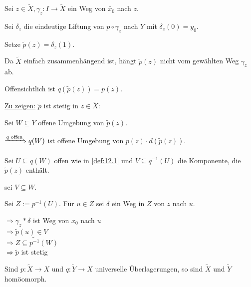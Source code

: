 \begin{beweis}
    Sei $z \in \tilde{X}, \gamma_z: I \rightarrow \tilde{X}$ ein Weg von
    $\tilde{x_0}$ nach $z$.

    Sei $\delta_z$ die eindeutige Liftung von $p \circ \gamma_z$
    nach $Y$ mit $\delta_z(0) = y_0$.

    Setze $\tilde{p}(z) = \delta_z(1)$.

    Da $\tilde{X}$ einfach zusammenhängend ist, hängt $\tilde{p}(z)$
    nicht vom gewählten Weg $\gamma_z$ ab.

    Offensichtlich ist $q(\tilde{p}(z)) = p(z)$.

    \underline{Zu zeigen:} $\tilde{p}$ ist stetig in $z \in \tilde{X}$:
    
    Sei $W \subseteq Y$ offene Umgebung von $\tilde{p}(z)$.

    $\xRightarrow{q \text{ offen}} q(W)$ ist offene Umgebung von $p(z) \cdot d(\tilde{p}(z))$.

    Sei $U \subseteq q(W)$ offen wie in \cref{def:12.1} und
    $V \subseteq q^{-1}(U)$ die Komponente, die $\tilde{p}(z)$
    enthält.

    \Obda sei $V \subseteq W$.

    Sei $Z := p^{-1}(U)$. Für $u \in Z$ sei $\delta$ ein Weg in $Z$
    von $z$ nach $u$.

    $\Rightarrow \gamma_z * \delta$ ist Weg von $x_0$ nach $u$\\
    $\Rightarrow \tilde{p}(u) \in V$\\
    $\Rightarrow Z \subseteq \tilde{p^{-1}}(W)$\\
    $\Rightarrow \tilde{p}$ ist stetig
\end{beweis}

\begin{folgerung}%
    Sind $p:\tilde{X} \rightarrow X$ und $q: \tilde{Y} \rightarrow X$
    universelle Überlagerungen, so sind $\tilde{X}$ und $\tilde{Y}$
    homöomorph.
\end{folgerung}

